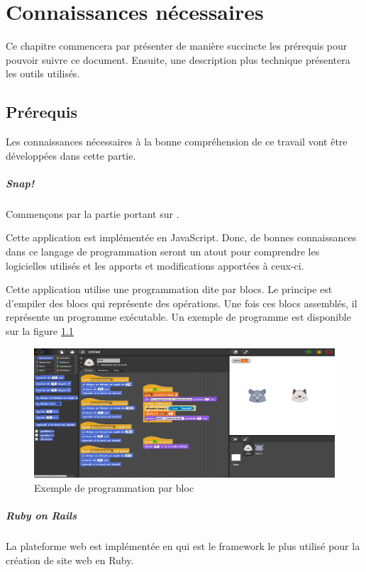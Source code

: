 \chapter{Connaissances nécessaires}
Ce chapitre commencera par présenter de manière succincte les prérequis pour pouvoir suivre ce document. Ensuite, une description plus technique présentera les outils utilisés.

\section{Prérequis}
Les connaissances nécessaires à la bonne compréhension de ce travail vont être développées dans cette partie.

\paragraph{Snap!}
Commençons par la partie portant sur .

Cette application est implémentée en JavaScript. Donc, de bonnes connaissances dans ce langage de programmation seront un atout pour comprendre les logicielles utilisés et les apports et modifications apportées à ceux-ci.

Cette application utilise une programmation dite par \glspl{bloc}. Le principe est d'empiler des \glspl{bloc} qui représente des opérations. Une fois ces \glspl{bloc} assemblés, il représente un programme exécutable. Un exemple de programme est disponible sur la figure \ref{fig:prog}

\begin{figure}
  \begin{center}
  \includegraphics[width=\textwidth]{content/4-prerequis/images/snap}
        \caption{Exemple de programmation par bloc}
    \label{fig:prog}
  \end{center}
\end{figure}


\paragraph{Ruby on Rails}
La plateforme web est implémentée en  qui est le framework le plus utilisé pour la création de site web en Ruby.

